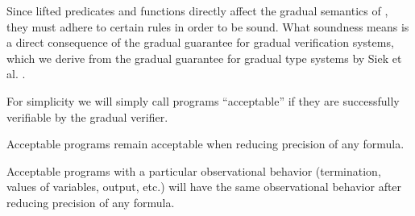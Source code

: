 Since lifted predicates and functions directly affect the gradual semantics of \gvl, they must adhere to certain rules in order to be sound.
What soundness means is a direct consequence of the gradual guarantee for gradual verification systems, which we derive from the gradual guarantee for gradual type systems by Siek et al. \cite{siek2015refined}.

For simplicity we will simply call programs “acceptable” if they are successfully verifiable by the gradual verifier.

\begin{definition}
    \label{grad-guarantee-static}
    Acceptable programs remain acceptable when reducing precision of any formula.
\end{definition}

\begin{definition}
    \label{grad-guarantee-dynamic}
    Acceptable programs with a particular observational behavior (termination, values of variables, output, etc.) will have the same observational behavior after reducing precision of any formula.
\end{definition}

\begin{comment}




PROBABLY UNNECESSARY:\\
Because of its generality, we will pursue the approach introduced in section \ref{ssec:wildcard-with-upper} for the remainder of this chapter.
As concretization we chose the semantic version, as it is more flexible than the syntactic one in practice.
For reference, the full definitions:
\begin{align*} 
&\text{Syntax:}\\
&\grad{\phi} ::= \phi ~|~ \withqmGen{\phi}\\
\\
&\text{Concretization:}\\
&\gamma(\phi) = \{~ \phi ~\}     \quad\quad \forall \phi \in \setFormulaA\\
&\gamma(\withqmGen{\phi}) = \{~ \phi' \in \setFormulaA ~|~ \phiImplies{\phi'}{\phi} ~\}\\
&\gamma(\grad{\phi}) = \emptyset    \quad\textit{otherwise}
\end{align*}
\end{comment}
